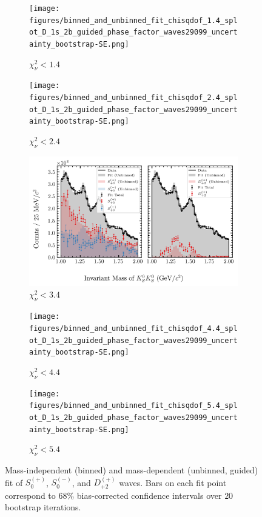 \begin{figure}[htbp]
    \centering
    \begin{subfigure}{0.45\textwidth}
        \texttt{[image: figures/binned\_and\_unbinned\_fit\_chisqdof\_1.4\_splot\_D\_1s\_2b\_guided\_phase\_factor\_waves29099\_uncertainty\_bootstrap-SE.png]}
        \caption{$\chi^2_\nu < 1.4$}
    \end{subfigure}
    \hfill
    \begin{subfigure}{0.45\textwidth}
        \texttt{[image: figures/binned\_and\_unbinned\_fit\_chisqdof\_2.4\_splot\_D\_1s\_2b\_guided\_phase\_factor\_waves29099\_uncertainty\_bootstrap-SE.png]}
        \caption{$\chi^2_\nu < 2.4$}
    \end{subfigure}

    \vspace{1em}

    \begin{subfigure}{0.8\textwidth}
        \includegraphics[width=\linewidth]{figures/binned_and_unbinned_fit_chisqdof_3.4_splot_D_1s_2b_guided_phase_factor_waves29099_uncertainty_bootstrap-SE.png}
        \caption{$\chi^2_\nu < 3.4$}
    \end{subfigure}

    \vspace{1em}

    \begin{subfigure}{0.45\textwidth}
        \texttt{[image: figures/binned\_and\_unbinned\_fit\_chisqdof\_4.4\_splot\_D\_1s\_2b\_guided\_phase\_factor\_waves29099\_uncertainty\_bootstrap-SE.png]}
        \caption{$\chi^2_\nu < 4.4$}
    \end{subfigure}
    \hfill
    \begin{subfigure}{0.45\textwidth}
        \texttt{[image: figures/binned\_and\_unbinned\_fit\_chisqdof\_5.4\_splot\_D\_1s\_2b\_guided\_phase\_factor\_waves29099\_uncertainty\_bootstrap-SE.png]}
        \caption{$\chi^2_\nu < 5.4$}
    \end{subfigure}

    \caption{Mass-independent (binned) and mass-dependent (unbinned, guided) fit of $S_{0}^{(+)}$, $S_{0}^{(-)}$, and $D_{+2}^{(+)}$ waves. Bars on each fit point correspond to $68\%$ bias-corrected confidence intervals over $20$ bootstrap iterations.}
    \label{fig:unbinned-guided-fit-all-Spn-D2p}
\end{figure}
